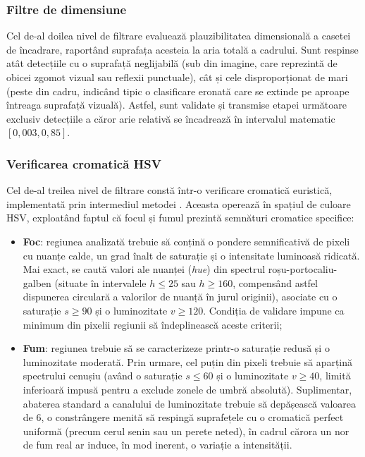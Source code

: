 \documentclass[../../main.tex]{subfiles}
\begin{document}
\subsubsection{Filtre de dimensiune}
\label{subsubsec:filtre_dimensiune}

Cel de-al doilea nivel de filtrare evaluează plauzibilitatea dimensională a casetei de încadrare, raportând suprafața acesteia la aria totală a cadrului. Sunt respinse atât detecțiile cu o suprafață neglijabilă (sub  din imagine, care reprezintă de obicei zgomot vizual sau reflexii punctuale), cât și cele disproporționat de mari (peste  din cadru, indicând tipic o clasificare eronată care se extinde pe aproape întreaga suprafață vizuală). Astfel, sunt validate și transmise etapei următoare exclusiv detecțiile a căror arie relativă se încadrează în intervalul matematic $[0{,}003, 0{,}85]$.

\subsubsection{Verificarea cromatică HSV}
\label{subsubsec:verificare_hsv}

Cel de-al treilea nivel de filtrare constă într-o verificare cromatică euristică, implementată prin intermediul metodei . Aceasta operează în spațiul de culoare HSV, exploatând faptul că focul și fumul prezintă semnături cromatice specifice:

\begin{itemize}
	\item \textbf{Foc}: regiunea analizată trebuie să conțină o pondere semnificativă de pixeli cu nuanțe calde, un grad înalt de saturație și o intensitate luminoasă ridicată. Mai exact, se caută valori ale nuanței (\textit{hue}) din spectrul roșu-portocaliu-galben (situate în intervalele $h \leq 25$ sau $h \geq 160$, compensând astfel dispunerea circulară a valorilor de nuanță în jurul originii), asociate cu o saturație $s \geq 90$ și o luminozitate $v \geq 120$. Condiția de validare impune ca minimum  din pixelii regiunii să îndeplinească aceste criterii;
	\item \textbf{Fum}: regiunea trebuie să se caracterizeze printr-o saturație redusă și o luminozitate moderată. Prin urmare, cel puțin  din pixeli trebuie să aparțină spectrului cenușiu (având o saturație $s \leq 60$ și o luminozitate $v \geq 40$, limită inferioară impusă pentru a exclude zonele de umbră absolută). Suplimentar, abaterea standard a canalului de luminozitate trebuie să depășească valoarea de $6$, o constrângere menită să respingă suprafețele cu o cromatică perfect uniformă (precum cerul senin sau un perete neted), în cadrul cărora un nor de fum real ar induce, în mod inerent, o variație a intensității.
\end{itemize}
\end{document}
